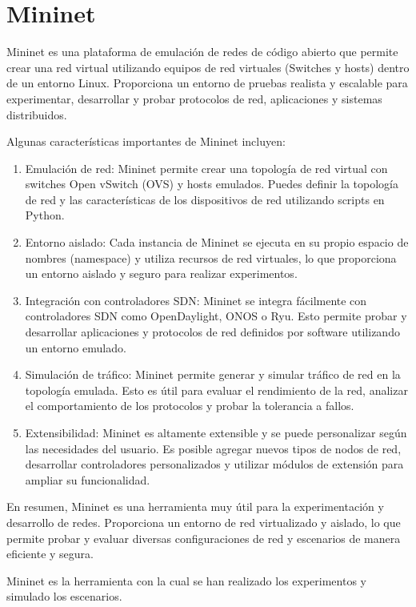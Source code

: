 \documentclass[a4paper, 12pt]{book}
\begin{document}
	\section{Mininet} 
	\label{sec:mininet}
	
	Mininet es una plataforma de emulación de redes de código abierto que permite crear una red virtual utilizando equipos de red virtuales (Switches y hosts) dentro de un entorno Linux. Proporciona un entorno de pruebas realista y escalable para experimentar, desarrollar y probar protocolos de red, aplicaciones y sistemas distribuidos.
	
	Algunas características importantes de Mininet incluyen:
	
	\begin{enumerate}
		\item 	Emulación de red: Mininet permite crear una topología de red virtual con switches Open vSwitch (OVS) y hosts emulados. Puedes definir la topología de red y las características de los dispositivos de red utilizando scripts en Python.
		\item 	Entorno aislado: Cada instancia de Mininet se ejecuta en su propio espacio de nombres (namespace) y utiliza recursos de red virtuales, lo que proporciona un entorno aislado y seguro para realizar experimentos.
		\item 	Integración con controladores SDN: Mininet se integra fácilmente con controladores SDN como OpenDaylight, ONOS o Ryu. Esto permite probar y desarrollar aplicaciones y protocolos de red definidos por software utilizando un entorno emulado.
		\item 	Simulación de tráfico: Mininet permite generar y simular tráfico de red en la topología emulada. Esto es útil para evaluar el rendimiento de la red, analizar el comportamiento de los protocolos y probar la tolerancia a fallos.
		\item   Extensibilidad: Mininet es altamente extensible y se puede personalizar según las necesidades del usuario. Es posible agregar nuevos tipos de nodos de red, desarrollar controladores personalizados y utilizar módulos de extensión para ampliar su funcionalidad.
	\end{enumerate}
	
	
	En resumen, Mininet es una herramienta muy útil para la experimentación y desarrollo de redes. Proporciona un entorno de red virtualizado y aislado, lo que permite probar y evaluar diversas configuraciones de red y escenarios de manera eficiente y segura.
	
	Mininet es la herramienta con la cual se han realizado los experimentos y simulado los escenarios.
	
\end{document}
